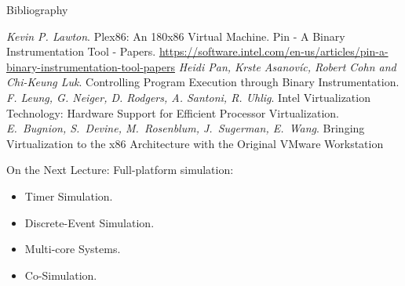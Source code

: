 \begin{frame}[allowframebreaks]{Bibliography}
\begin{thebibliography}{99}
\bibitem{} \textit{Kevin P. Lawton}. Plex86: An 180x86 Virtual Machine.
\bibitem{} Pin - A Binary Instrumentation Tool - Papers.
  \url{https://software.intel.com/en-us/articles/pin-a-binary-instrumentation-tool-papers}
\bibitem{} \textit{Heidi Pan, Krste Asanovíc, Robert Cohn and Chi-Keung Luk}.
  Controlling Program Execution through Binary Instrumentation.
\bibitem{} \textit{F. Leung, G. Neiger, D. Rodgers, A. Santoni, R. Uhlig}.
  Intel Virtualization Technology: Hardware Support for Efficient Processor
  Virtualization.
\bibitem{} \textit{E.~Bugnion, S.~Devine, M.~Rosenblum, J.~Sugerman, E.~Wang}.
  Bringing Virtualization to the x86 Architecture with the Original VMware
  Workstation
\end{thebibliography}
\end{frame}

\begin{frame}{On the Next Lecture:}
Full-platform simulation:
\begin{itemize}
\item Timer Simulation.
\item Discrete-Event Simulation.
\item Multi-core Systems.
\item Co-Simulation.
\end{itemize}
\end{frame}

\finalslide


